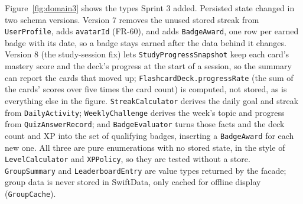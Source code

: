 \documentclass[12pt,letterpaper]{article}
\begin{document}
Figure~\ref{fig:domain3} shows the types Sprint 3 added. Persisted state changed
in two schema versions. Version 7 removes the unused stored streak from
\texttt{UserProfile}, adds \texttt{avatarId} (FR-60), and adds \texttt{BadgeAward}, one
row per earned badge with its date, so a badge stays earned after the data behind it
changes. Version 8 (the study-session fix) lets \texttt{StudyProgressSnapshot} keep
each card's mastery score and the deck's progress at the start of a session, so the
summary can report the cards that moved up; \texttt{FlashcardDeck.progressRate} (the
sum of the cards' scores over five times the card count) is computed, not stored, as
is everything else in the figure. \texttt{StreakCalculator} derives the daily goal
and streak from \texttt{DailyActivity}; \texttt{WeeklyChallenge} derives the week's
topic and progress from \texttt{QuizAnswerRecord}; and \texttt{BadgeEvaluator} turns
those facts and the deck count and XP into the set of qualifying badges, inserting a
\texttt{BadgeAward} for each new one. All three are pure enumerations with no stored
state, in the style of \texttt{LevelCalculator} and \texttt{XPPolicy}, so they are
tested without a store. \texttt{GroupSummary} and \texttt{LeaderboardEntry} are value
types returned by the facade; group data is never stored in SwiftData, only cached for
offline display (\texttt{GroupCache}).

\FloatBarrier
\end{document}
